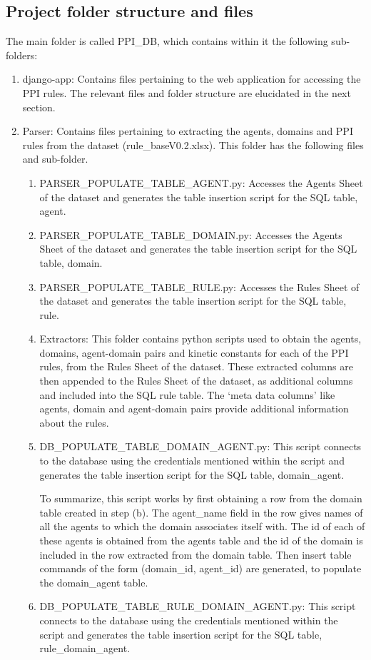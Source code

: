 \documentclass[msc,deptreport,ai]{infthesis}      %
\begin{document}
\subsection{Project folder structure and files}
The main folder is called PPI\_DB, which contains within it the following sub-folders:
 \begin{enumerate}
 	\item django-app: Contains files pertaining to the web application for accessing the PPI rules. The relevant files and folder structure are elucidated in the next section.
 	\item Parser: Contains files pertaining to extracting the agents, domains and PPI rules from the dataset (rule\_baseV0.2.xlsx). This folder has the following files and sub-folder.
 	\begin{enumerate}
 		\item PARSER\_POPULATE\_TABLE\_AGENT.py: Accesses the Agents Sheet of the dataset and generates the table insertion script for the  SQL table, agent.
 		\item PARSER\_POPULATE\_TABLE\_DOMAIN.py: Accesses the Agents Sheet of the dataset and generates the table insertion script for the SQL table, domain.
 		\item PARSER\_POPULATE\_TABLE\_RULE.py: Accesses the Rules Sheet of the dataset and generates the table insertion script for the SQL table, rule.
 		\item Extractors: This folder contains python scripts used to obtain the agents, domains, agent-domain pairs and kinetic constants for each of the PPI rules, from the Rules Sheet of the dataset. These extracted columns are then appended to the Rules Sheet of the dataset, as additional columns and included into the SQL rule table. The `meta data columns' like agents, domain and agent-domain pairs provide additional information about the rules.
 		\item DB\_POPULATE\_TABLE\_DOMAIN\_AGENT.py: This script connects to the database using the credentials mentioned within the script and generates the table insertion script for the SQL table, domain\_agent. 
 		
 		To summarize, this script works by first obtaining a row from the domain table created in step (b). The agent\_name field in the row gives names of all the agents to which the domain associates itself with. The id of each of these agents is obtained from the agents table and the id of the domain is included in the row extracted from the domain table. Then insert table commands of the form (domain\_id, agent\_id) are generated, to populate the domain\_agent table.
 		\item DB\_POPULATE\_TABLE\_RULE\_DOMAIN\_AGENT.py: This script connects to the database using the credentials mentioned within the script and generates the table insertion script for the SQL table, rule\_domain\_agent. 
 		

\end{enumerate}
\end{enumerate}
\end{document}
